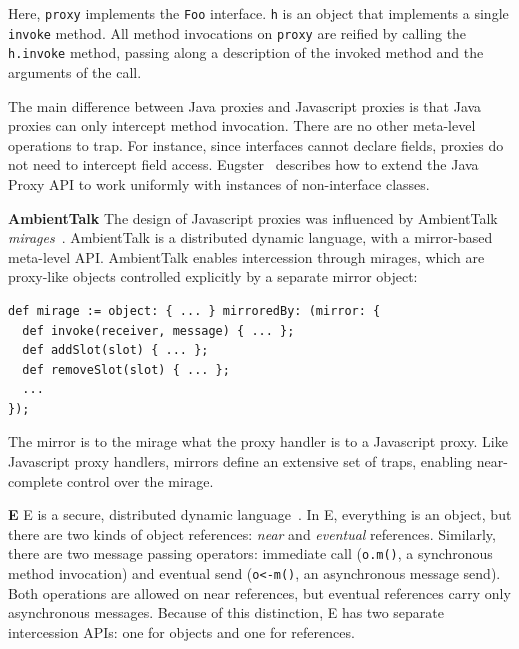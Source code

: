 \documentclass{acm_proc_article-sp}
\begin{document}
Here, \texttt{proxy} implements the \texttt{Foo} interface. \texttt{h} is an object that implements a single \texttt{invoke} method. All method invocations on \texttt{proxy} are reified by calling the \texttt{h.invoke} method, passing along a description of the invoked method and the arguments of the call.

The main difference between Java proxies and Javascript proxies is that Java proxies can only intercept method invocation. There are no other meta-level operations to trap. For instance, since interfaces cannot declare fields, proxies do not need to intercept field access. Eugster~\cite{eugster06uniform} describes how to extend the Java Proxy API to work uniformly with instances of non-interface classes.

\textbf{AmbientTalk} The design of Javascript proxies was influenced by AmbientTalk \emph{mirages}~\cite{mostinckx07behavioral,mostinckx09mirrors}. AmbientTalk is a distributed dynamic language, with a mirror-based meta-level API. AmbientTalk enables intercession through mirages, which are proxy-like objects controlled explicitly by a separate mirror object:

\begin{lstlisting}[]
def mirage := object: { ... } mirroredBy: (mirror: {
  def invoke(receiver, message) { ... };
  def addSlot(slot) { ... };
  def removeSlot(slot) { ... };
  ...
});
\end{lstlisting}

The mirror is to the mirage what the proxy handler is to a Javascript proxy. Like Javascript proxy handlers, mirrors define an extensive set of traps, enabling near-complete control over the mirage.

\textbf{E} E is a secure, distributed dynamic language~\cite{miller05concurrency}. In E, everything is an object, but there are two kinds of object references: \emph{near} and \emph{eventual} references. Similarly, there are two message passing operators: immediate call (\texttt{o.m()}, a synchronous method invocation) and eventual send (\texttt{o<-m()}, an asynchronous message send). Both operations are allowed on near references, but eventual references carry only asynchronous messages. Because of this distinction, E has two separate intercession APIs: one for objects and one for references.
\end{document}
